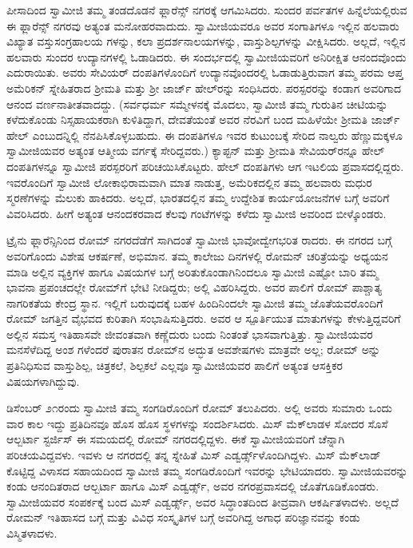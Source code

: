 ಪೀಸಾದಿಂದ ಸ್ವಾಮೀಜಿ ತಮ್ಮ ತಂಡದೊಡನೆ ಫ್ಲಾರೆನ್ಸ್ ನಗರಕ್ಕೆ ಆಗಮಿಸಿದರು. ಸುಂದರ ಪರ್ವತಗಳ ಹಿನ್ನೆಲೆಯಲ್ಲಿರುವ ಈ ಫ್ಲಾರೆನ್ಸ್ ನಗರವು ಅತ್ಯಂತ ಮನೋಹರವಾದುದು. ಸ್ವಾಮೀಜಿಯವರೂ ಅವರ ಸಂಗಾತಿಗಳೂ ಇಲ್ಲಿನ ಹಲವಾರು ವಿಖ್ಯಾತ ವಸ್ತುಸಂಗ್ರಹಾಲಯ ಗಳನ್ನು, ಕಲಾ ಪ್ರದರ್ಶನಾಲಯಗಳನ್ನು, ವಾಸ್ತುಶಿಲ್ಪಗಳನ್ನು ವೀಕ್ಷಿಸಿದರು. ಅಲ್ಲದೆ, ಇಲ್ಲಿನ ಹಲವಾರು ಸುಂದರ ಉದ್ಯಾನಗಳಲ್ಲಿ ಓಡಾಡಿದರು. ಈ ಸಂದರ್ಭದಲ್ಲಿ ಸ್ವಾಮೀಜಿಯವರಿಗೆ ಅನಿರೀಕ್ಷಿತ ಆನಂದವೊಂದು ಎದುರಾಯಿತು. ಅವರು ಸೇವಿಯರ್ ದಂಪತಿಗಳೊಂದಿಗೆ ಉದ್ಯಾನವೊಂದರಲ್ಲಿ ಓಡಾಡುತ್ತಿರುವಾಗ ತಮ್ಮ ಪರಮ ಆಪ್ತ ಅಮೆರಿಕನ್ ಸ್ನೇಹಿತರಾದ ಶ್ರೀಮತಿ ಮತ್ತು ಶ್ರೀ ಜಾರ್ಜ್ ಹೇಲ್​ರನ್ನು ಸಂಧಿಸಿದರು. ಪರಸ್ಪರರನ್ನು ಕಂಡಾಗ ಅವರಿಗಾದ ಆನಂದ ವರ್ಣನಾತೀತವಾದದ್ದು. (ಸರ್ವಧರ್ಮ ಸಮ್ಮೇಳನಕ್ಕೆ ಮೊದಲು, ಸ್ವಾಮೀಜಿ ತಮ್ಮ ಗುರುತಿನ ಚೀಟಿಯನ್ನು ಕಳೆದುಕೊಂಡು ನಿಸ್ಸಹಾಯಕರಾಗಿ ಕುಳಿತಿದ್ದಾಗ, ದೇವತೆಯಂತೆ ಅವರ ನೆರವಿಗೆ ಬಂದ ಮಹಿಳೆಯೇ ಶ್ರೀಮತಿ ಜಾರ್ಜ್ ಹೇಲ್ ಎಂಬುದನ್ನಿಲ್ಲಿ ನೆನಪಿಸಿಕೊಳ್ಳಬಹುದು. ಈ ದಂಪತಿಗಳೂ ಇವರ ಕುಟುಂಬಕ್ಕೆ ಸೇರಿದ ನಾಲ್ವರು ಹೆಣ್ಣುಮಕ್ಕಳೂ ಸ್ವಾಮೀಜಿಯವರ ಅತ್ಯಂತ ಆತ್ಮೀಯ ವರ್ಗಕ್ಕೆ ಸೇರಿದ್ದವರು.) ಕ್ಯಾಪ್ಟನ್ ಮತ್ತು ಶ್ರೀಮತಿ ಸೇವಿಯರ್​ರನ್ನೂ ಹೇಲ್ ದಂಪತಿಗಳನ್ನೂ ಸ್ವಾಮೀಜಿ ಪರಸ್ಪರರಿಗೆ ಪರಿಚಯಿಸಿಕೊಟ್ಟರು. ಹೇಲ್ ದಂಪತಿಗಳು ಆಗ ಇಟಲಿಯ ಪ್ರವಾಸದಲ್ಲಿದ್ದರು. ಇವರೊಂದಿಗೆ ಸ್ವಾಮೀಜಿ ಲೋಕಾಭಿರಾಮವಾಗಿ ಮಾತ ನಾಡುತ್ತ, ಅಮೆರಿಕದಲ್ಲಿನ ತಮ್ಮ ಹಲವಾರು ಮಧುರ ಸ್ಮರಣೆಗಳನ್ನು ಮೆಲುಕು ಹಾಕಿದರು. ಅಲ್ಲದೆ, ಭಾರತದಲ್ಲಿನ ತಮ್ಮ ಉದ್ದೇಶಿತ ಕಾರ್ಯಯೋಜನೆಗಳ ಬಗ್ಗೆ ಅವರಿಗೆ ವಿವರಿಸಿದರು. ಹೀಗೆ ಅತ್ಯಂತ ಆನಂದಕರವಾದ ಕೆಲವು ಗಂಟೆಗಳನ್ನು ಕಳೆದು ಸ್ವಾಮೀಜಿ ಅವರಿಂದ ಬೀಳ್ಕೊಂಡರು.

ಟ್ರೈನು ಫ್ಲಾರೆನ್ಸಿನಿಂದ ರೋಮ್ ನಗರದೆಡೆಗೆ ಸಾಗಿದಂತೆ ಸ್ವಾಮೀಜಿ ಭಾವೋದ್ವೇಗಭರಿತ ರಾದರು. ಈ ನಗರದ ಬಗ್ಗೆ ಅವರಿಗೊಂದು ವಿಶೇಷ ಆಕರ್ಷಣೆ, ಅಭಿಮಾನ. ತಮ್ಮ ಕಾಲೇಜು ದಿನಗಳಲ್ಲಿ ರೋಮನ್ ಚರಿತ್ರೆಯನ್ನು ಅಧ್ಯಯನ ಮಾಡಿ ಅಲ್ಲಿನ ವ್ಯಕ್ತಿಗಳ ಹಾಗೂ ವಿಷಯಗಳ ಬಗ್ಗೆ ಅರಿತುಕೊಂಡಾಗಿನಿಂದಲೂ ಸ್ವಾಮೀಜಿ ಎಷ್ಟೋ ಬಾರಿ ತಮ್ಮ ಭಾವನಾ ಪ್ರಪಂಚದಲ್ಲೇ ರೋಮ್​ಗೆ ಭೇಟಿ ನೀಡಿದ್ದರು; ಅಲ್ಲಿ ವಿಹರಿಸಿದ್ದರು. ಅವರ ಪಾಲಿಗೆ ರೋಮ್ ಪಾಶ್ಚಾತ್ಯ ನಾಗರಿಕತೆಯ ಕೇಂದ್ರ ಸ್ಥಾನ. ಇಲ್ಲಿಗೆ ಬರುವುದಕ್ಕೆ ಬಹಳ ಹಿಂದಿನಿಂದಲೇ ಸ್ವಾಮೀಜಿ ತಮ್ಮ ಜೊತೆಯವರೊಂದಿಗೆ ರೋಮ್ ಜಗತ್ತಿನ ವೈಭವದ ಕುರಿತಾಗಿ ಸಂಭಾಷಿಸುತ್ತಿದರು. ಅವರ ಆ ಸ್ಪೂರ್ತಿಯುತ ಮಾತುಗಳನ್ನು ಕೇಳುತ್ತಿದ್ದವರಿಗೆ ಅಲ್ಲಿನ ಸಮಸ್ತ ಇತಿಹಾಸವೇ ಜೀವಂತವಾಗಿ ಕಣ್ಣೆದುರು ಬಂದು ನಿಂತಂತೆ ಭಾಸವಾಗುತ್ತಿತ್ತು. ಸ್ವಾಮೀಜಿಯವರ ಮನಸೆಳೆದಿದ್ದ ಅಂಶ ಗಳೆಂದರೆ ಪುರಾತನ ರೋಮ್​ನ ಅದ್ಭುತ ಅವಶೇಷಗಳು ಮಾತ್ರವೇ ಅಲ್ಲ; ರೋಮ್ ಅನ್ನು ಪ್ರತಿನಿಧಿಸುವ ವಾಸ್ತುಶಿಲ್ಪ, ಚಿತ್ರಕಲೆ, ಶಿಲ್ಪಕಲೆ ಎಲ್ಲವೂ ಸ್ವಾಮೀಜಿಯವರ ಪಾಲಿಗೆ ಅತ್ಯಂತ ಆಸಕ್ತಿಕರ ವಿಷಯಗಳಾಗಿದ್ದುವು.

ಡಿಸೆಂಬರ್ ೨೧ರಂದು ಸ್ವಾಮೀಜಿ ತಮ್ಮ ಸಂಗಡಿರೊಂದಿಗೆ ರೋಮ್ ತಲುಪಿದರು. ಅಲ್ಲಿ ಅವರು ಸುಮಾರು ಒಂದು ವಾರ ಕಾಲ ಇದ್ದು ಪ್ರತಿದಿನವೂ ಹೊಸ ಹೊಸ ಸ್ಥಳಗಳನ್ನು ಸಂದರ್ಶಿಸಿದರು. ಮಿಸ್ ಮೆಕ್​ಲಾಡಳ ಸೋದರ ಸೊಸೆ ಆಲ್ಬರ್ಟಾ ಸ್ಟರ್ಜಿಸ್ ಈ ಸಮಯದಲ್ಲಿ ರೋಮ್ ನಗರದಲ್ಲಿದ್ದಳು. ಈಕೆ ಸ್ವಾಮೀಜಿಯವರಿಗೆ ಚೆನ್ನಾಗಿ ಪರಿಚಯವಿದ್ದವಳು. ಇವಳು ಆ ನಗರದಲ್ಲಿ ತನ್ನ ಸ್ನೇಹಿತೆ ಮಿಸ್ ಎಡ್ವರ್ಡ್ಸ್​ಳೊಂದಿಗಿದ್ದಳು. ಮಿಸ್ ಮೆಕ್​ಲಾಡ್ ಕೊಟ್ಟಿದ್ದ ವಿಳಾಸದ ಸಹಾಯದಿಂದ ಸ್ವಾಮೀಜಿ ತಮ್ಮ ಸಂಗಡಿರೊಂದಿಗೆ ಇವರನ್ನು ಭೇಟಿಯಾದರು. ಸ್ವಾಮೀಜಿಯವರನ್ನು ಕಂಡು ಆನಂದಿತರಾದ ಆಲ್ಬರ್ಟಾ ಹಾಗೂ ಮಿಸ್ ಎಡ್ವರ್ಡ್ಸ್, ಅವರ ನಗರಪ್ರವಾಸದಲ್ಲಿ ಜೊತೆಗೂಡಿಕೊಂಡರು. ಸ್ವಾಮೀಜಿಯವರ ಸಂಪರ್ಕಕ್ಕೆ ಬಂದ ಮಿಸ್ ಎಡ್ವರ್ಡ್ಸ್, ಅವರ ಸಿದ್ಧಾಂತದಿಂದ ತೀವ್ರವಾಗಿ ಆಕರ್ಷಿತಳಾದಳು. ಅಲ್ಲದೆ ರೋಮನ್ ಇತಿಹಾಸದ ಬಗ್ಗೆ ಮತ್ತು ವಿವಿಧ ಸಂಸ್ಕೃತಿಗಳ ಬಗ್ಗೆ ಅವರಿಗಿದ್ದ ಅಗಾಧ ಪರಿಜ್ಞಾನವನ್ನು ಕಂಡು ವಿಸ್ಮಿತಳಾದಳು.

